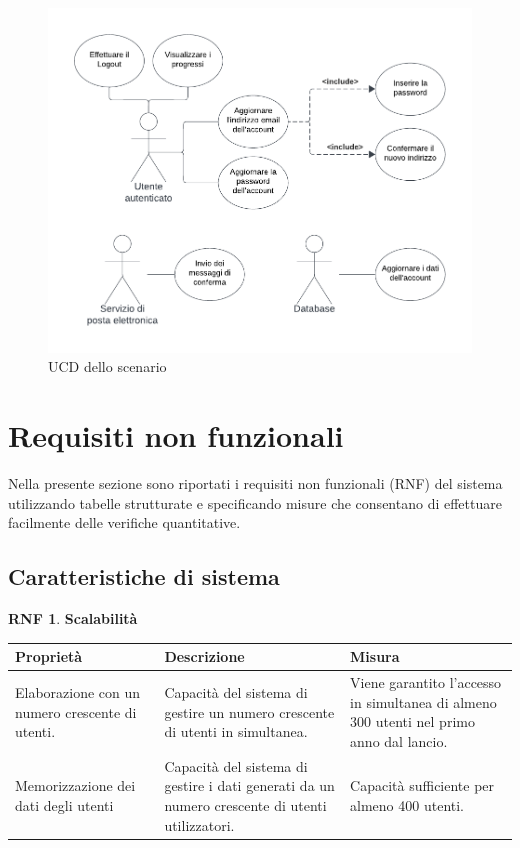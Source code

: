 \documentclass[11pt, a4paper]{article}
\theoremstyle{definition}
\newtheorem{nonfuncreq}{RNF} %
\begin{document}
\begin{figure}[H]
\centering
\includegraphics[scale=0.8]{materiale/gestione-account.pdf}
\caption{UCD dello scenario}
\end{figure}

\newpage
\section{Requisiti non funzionali}
Nella presente sezione sono riportati i requisiti non funzionali (RNF)
del sistema utilizzando tabelle strutturate e specificando misure che
consentano di effettuare facilmente delle verifiche quantitative.

\subsection{Caratteristiche di sistema}

\begin{nonfuncreq}
\textbf{Scalabilità }
\begin{center}
    \footnotesize
    \begin{tabularx}{\textwidth}{|X||X||X|}
        \hline
        \cellcolor{red!70}Proprietà & \cellcolor{red!70}Descrizione & \cellcolor{red!70}Misura\\
        \hline
        Elaborazione con un numero crescente di utenti. & Capacità del sistema di gestire un numero crescente di utenti in simultanea. & Viene garantito l'accesso in simultanea di almeno 300 utenti nel primo anno dal lancio.\\
        \hline
        Memorizzazione dei dati degli utenti & Capacità del sistema di gestire i dati generati da un numero crescente di utenti utilizzatori. & Capacità sufficiente per almeno 400 utenti. \\
        \hline
    \end{tabularx}
\end{center}
\end{nonfuncreq}
\end{document}

